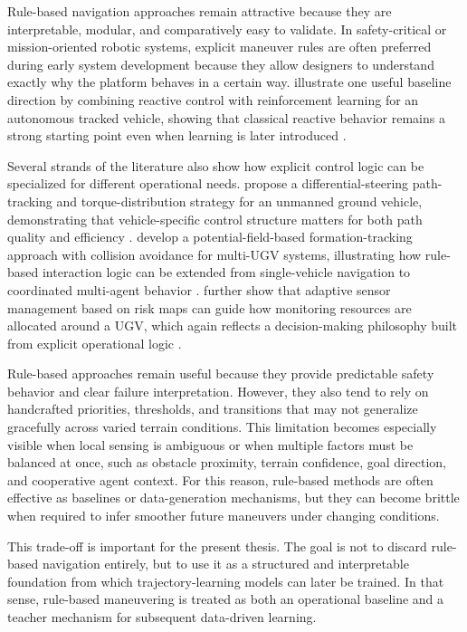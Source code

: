 Rule-based navigation approaches remain attractive because they are interpretable, modular, and comparatively easy to validate. In safety-critical or mission-oriented robotic systems, explicit maneuver rules are often preferred during early system development because they allow designers to understand exactly why the platform behaves in a certain way. \citeauthor{vincent2012combined} illustrate one useful baseline direction by combining reactive control with reinforcement learning for an autonomous tracked vehicle, showing that classical reactive behavior remains a strong starting point even when learning is later introduced \citep{vincent2012combined}.

Several strands of the literature also show how explicit control logic can be specialized for different operational needs. \citeauthor{jiang2022differential} propose a differential-steering path-tracking and torque-distribution strategy for an unmanned ground vehicle, demonstrating that vehicle-specific control structure matters for both path quality and efficiency \citep{jiang2022differential}. \citeauthor{hu2023potential} develop a potential-field-based formation-tracking approach with collision avoidance for multi-UGV systems, illustrating how rule-based interaction logic can be extended from single-vehicle navigation to coordinated multi-agent behavior \citep{hu2023potential}. \citeauthor{kim2024adaptive} further show that adaptive sensor management based on risk maps can guide how monitoring resources are allocated around a UGV, which again reflects a decision-making philosophy built from explicit operational logic \citep{kim2024adaptive}.

Rule-based approaches remain useful because they provide predictable safety behavior and clear failure interpretation. However, they also tend to rely on handcrafted priorities, thresholds, and transitions that may not generalize gracefully across varied terrain conditions. This limitation becomes especially visible when local sensing is ambiguous or when multiple factors must be balanced at once, such as obstacle proximity, terrain confidence, goal direction, and cooperative agent context. For this reason, rule-based methods are often effective as baselines or data-generation mechanisms, but they can become brittle when required to infer smoother future maneuvers under changing conditions.

This trade-off is important for the present thesis. The goal is not to discard rule-based navigation entirely, but to use it as a structured and interpretable foundation from which trajectory-learning models can later be trained. In that sense, rule-based maneuvering is treated as both an operational baseline and a teacher mechanism for subsequent data-driven learning.

